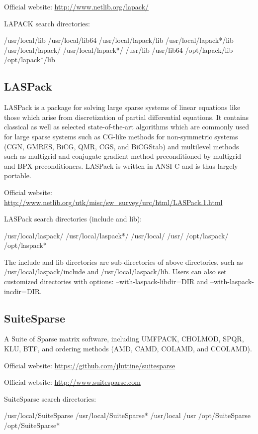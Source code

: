 Official website: \url{http://www.netlib.org/lapack/}

LAPACK search directories:
\begin{evb}
/usr/local/lib
/usr/local/lib64
/usr/local/lapack/lib
/usr/local/lapack*/lib
/usr/local/lapack/
/usr/local/lapack*/
/usr/lib
/usr/lib64
/opt/lapack/lib
/opt/lapack*/lib
\end{evb}

\subsection{LASPack}
LASPack is a package for solving large sparse systems of linear equations like those which arise from discretization of partial differential equations.  It contains classical as well as selected state-of-the-art algorithms which are commonly used for large sparse systems such as CG-like methods for non-symmetric systems (CGN, GMRES, BiCG, QMR, CGS, and BiCGStab) and multilevel methods such as multigrid and conjugate gradient method preconditioned by multigrid and BPX preconditioners.  LASPack is written in ANSI C and is thus largely portable.  

Official website: {\small \url{http://www.netlib.org/utk/misc/sw_survey/urc/html/LASPack.1.html}}

LASPack search directories (include and lib):
\begin{evb}
/usr/local/laspack/
/usr/local/laspack*/
/usr/local/
/usr/
/opt/laspack/
/opt/laspack*
\end{evb}
The include and lib directories are sub-directories of above directories, such as /usr/local/laspack/include and /usr/local/laspack/lib. Users can also set customized directories with options: --with-laspack-libdir=DIR and --with-laspack-incdir=DIR.

\subsection{SuiteSparse}
A Suite of Sparse matrix software, including UMFPACK, CHOLMOD, SPQR, KLU, BTF, and ordering methods (AMD, CAMD, COLAMD, and CCOLAMD). 

Official website: \url{https://github.com/jluttine/suitesparse} 

Official website: \url{http://www.suitesparse.com}

SuiteSparse search directories:
\begin{evb}
/usr/local/SuiteSparse
/usr/local/SuiteSparse*
/usr/local
/usr
/opt/SuiteSparse 
/opt/SuiteSparse*
\end{evb}

